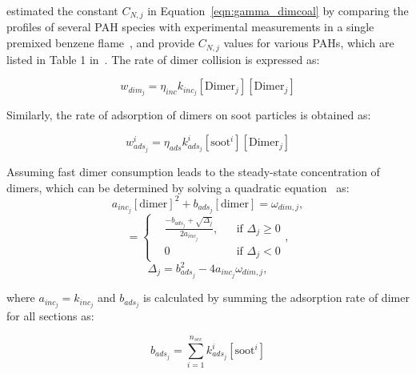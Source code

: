 \citet{blanquart2009joint} estimated the constant ${C_{N,j}}$ in Equation~\eqref{eqn:gamma_dimcoal} by comparing the profiles of several PAH species with experimental measurements in a single premixed benzene flame~\citep{tregrossi1999combustion}, and provide ${C_{N,j}}$ values for various PAHs, which are listed in Table 1 in~\citep{blanquart2009analyzing}. The rate of dimer collision is expressed as:

\begin{equation}
	w_{dim_j} = \eta_{inc} k_{inc_{j}} [\mathrm{Dimer}_j] [\mathrm{Dimer}_j]
	\label{eqn:wdim_dimcoal}
\end{equation}

Similarly, the rate of adsorption of dimers on soot particles is obtained as:

\begin{equation}
	w^i_{ads_j} = \eta_{ads} k^i_{ads_{j}} [\mathrm{soot}^i] [\mathrm{Dimer}_j]
\end{equation}

Assuming fast dimer consumption leads to the steady-state concentration of dimers, which can be determined by solving a quadratic equation~\citep{blanquart2009analyzing} as:
\begin{equation}
	a_{inc_j}[\mathrm{dimer}]^2+b_{ads_j}[\mathrm{dimer}]=\omega_{dim,j},
	\label{eqn:quad_dimcoal}
\end{equation}
\begin{equation}
	[\mathrm{Dimer}_j]=
	\left\{
	\begin{aligned}
		&\frac{-b_{ads_j}+\sqrt{\Delta_j}}{2a_{inc_j}},
		&&
		\text{if } \Delta_j \ge 0
		\\
		& 0 
		&&
		\text{if } \Delta_j < 0
	\end{aligned},
	\right.
	\label{eqn:dimer_dimcoal}
\end{equation}
\begin{equation}
	\Delta_j = b_{ads_j}^2-4a_{inc_j}\omega_{dim,j},
	\label{eqn:delta_dimcoal}
\end{equation}

\noindent where ${a_{inc_j} = k_{inc_{j}}}$ and ${b_{ads_j}}$ is calculated by summing the adsorption rate of dimer for all sections as:

\begin{equation}
	b_{ads_j} = \sum_{i=1}^{n_{sec}} k^i_{ads_{j}} [\mathrm{soot}^i]
\end{equation}

